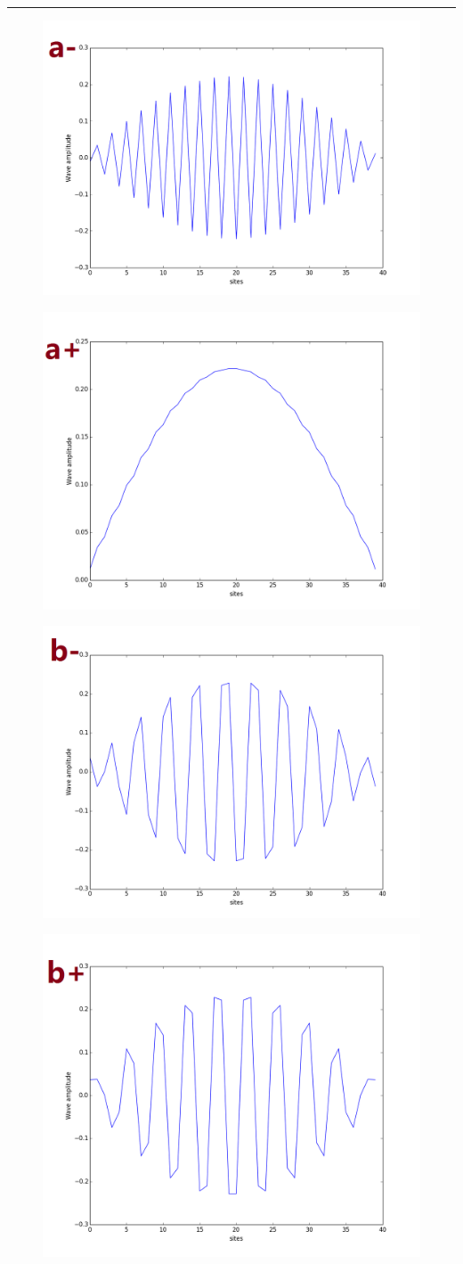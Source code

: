 \documentclass[letterpaper,10pt,english]{sphinxmanual}
\begin{document}
\bigskip\hrule{}\bigskip

\begin{figure}[htbp]
\centering

\includegraphics[width=0.550\linewidth]{a-.png}
\end{figure}
\begin{figure}[htbp]
\centering

\includegraphics[width=0.550\linewidth]{a+.png}
\end{figure}
\begin{figure}[htbp]
\centering

\includegraphics[width=0.550\linewidth]{b-.png}
\end{figure}
\begin{figure}[htbp]
\centering

\includegraphics[width=0.550\linewidth]{b+.png}
\end{figure}
\end{document}
